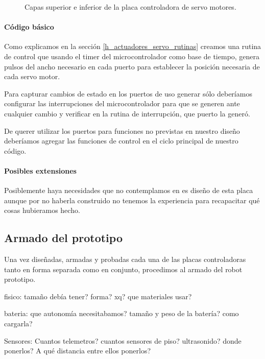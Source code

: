 \begin{figure}
	\caption{Capas superior e inferior de la placa controladora de servo motores.}
	\label{hF_placa_servo_capas}
\end{figure}

\paragraph{C\'odigo b\'asico}
\label{h_placas_servos_codigo}

Como explicamos en la secci\'on \ref{h_actuadores_servo_rutinas} creamos una rutina de control
que usando el timer del microcontrolador como base de tiempo, genera pulsos del ancho necesario
en cada puerto para establecer la posici\'on necesaria de cada servo motor.

Para capturar cambios de estado en los puertos de uso generar s\'olo deber\'iamos configurar las
interrupciones del microcontrolador para que se generen ante cualquier cambio y verificar en la
rutina de interrupci\'on, que puerto la gener\'o.

De querer utilizar los puertos para funciones no previstas en nuestro dise\~no deber\'iamos
agregar las funciones de control en el ciclo principal de nuestro c\'odigo.

\paragraph{Posibles extensiones}
\label{h_placas_servos_extensiones}

Posiblemente haya necesidades que no contemplamos en es dise\~no de esta placa aunque por no
haberla construido no tenemos la experiencia para recapacitar qu\'e cosas hubieramos hecho.

\subsection{Armado del prototipo}
\label{h_prototipo}

Una vez dise\~nadas, armadas y probadas cada una de las placas controladoras tanto en forma separada
como en conjunto, procedimos al armado del robot prototipo.

fisico:
tama\~no deb\'ia tener? forma? xq?
que materiales usar?

bateria:
que autonom\'ia necesitabamos? 
tama\~no y peso de la bater\'ia? como cargarla?

Sensores:
Cuantos telemetros? cuantos sensores de piso? ultrasonido?
donde ponerlos? A qu\'e distancia entre ellos ponerlos?

